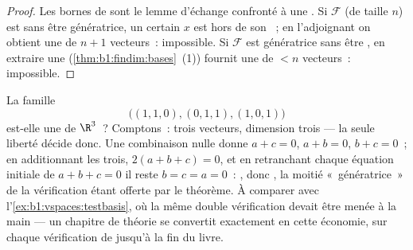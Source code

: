\begin{proof}
Les bornes de  sont le lemme d'échange confronté à une .
Si $\mathcal{F}$ (de taille $n$) est  sans être génératrice, un
certain $x$ est hors de son ~; en l'adjoignant on
obtient une  de $n + 1$ vecteurs~: impossible. Si
$\mathcal{F}$ est génératrice sans être , en extraire une 
(\cref{thm:b1:findim:bases}~(1)) fournit une  de $< n$ vecteurs~:
impossible.
\end{proof}

\begin{example}
\label{ex:b1:findim:twoofthreerun}
La famille
\[
\bigl((1,1,0), (0,1,1), (1,0,1)\bigr)
\]
est-elle une 
de $\R^3$~? Comptons~: trois vecteurs, dimension trois --- la seule
liberté décide donc. Une combinaison nulle donne $a + c = 0$, $a + b
= 0$, $b + c = 0$~; en additionnant les trois, $2(a + b + c) = 0$, et
en retranchant chaque équation initiale de $a + b + c = 0$ il reste
$b = c = a = 0$~: , donc , la moitié «~génératrice~» de la
vérification étant offerte par le théorème. À comparer avec
l'\cref{ex:b1:vspaces:testbasis}, où la même double vérification
devait être menée à la main --- un chapitre de théorie se convertit
exactement en cette économie, sur chaque vérification de 
jusqu'à la fin du livre.
\end{example}

